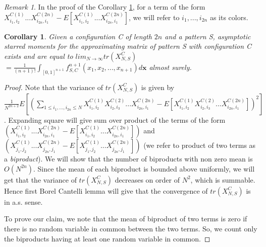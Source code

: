 \documentclass[12pt]{amsart}
\newtheorem{corollary}[thm]{Corollary}
\theoremstyle{definition}
\theoremstyle{remark}
\newtheorem{remark}{Remark}
\begin{document}
\begin{remark}\label{rem5}
In the proof of the Corollary \ref{as}, for a term of the form $X_{i_1,i_2}^{C(1)}...X_{i_{2n},i_{1}}^{C(2n)} - E[X_{i_1,i_2}^{C(1)}...X_{i_{2n},i_{1}}^{C(2n)}]$, we will refer to  $i_1,...,i_{2n}$ as its colors.
\end{remark}


\begin{corollary} \label{as}
Given a configuration C of length $2n$ and a pattern S, asymptotic starred moments for the approximating matrix of pattern S with configuration C exists and are equal to $ lim_{N \to \infty} tr(X_{N,S}^C)$ $= \frac{1}{(n+1)!}\int_{[0,1]^{n+1}}f_{S,C}^{n+1}(x_1,x_2,...,x_{n+1})d\mathbf{x}$ almost surely.
\end{corollary}
\begin{proof}
Note that the variance of $tr(X_{N,S}^C)$ is given by \\ $\frac{1}{N^{2n+2}} E[(\sum_{1 \leq i_1,...,i_{2n} \leq N} X_{i_1,i_2}^{C(1)}X_{i_2,i_3}^{C(2)}...X_{i_{2n},i_{1}}^{C(2n)} - E[X_{i_1,i_2}^{C(1)}X_{i_2,i_3}^{C(2)}...X_{i_{2n},i_{1}}^{C(2n)}])^2]$. Expanding square will give sum over product of the terms of the form $(X_{i_1,i_2}^{C(1)}...X_{i_{2n},i_{1}}^{C(2n)} - E[X_{i_1,i_2}^{C(1)}...X_{i_{2n},i_{1}}^{C(2n)}])$ and $(X_{j_1,j_2}^{C(1)}...X_{j_{2n},j_{1}}^{C(2n)} - E[X_{j_1,j_2}^{C(1)}...X_{j_{2n},j_{1}}^{C(2n)}])$ (we refer to product of two terms as a \textit{biproduct}). We will show that the number of biproducts with non zero mean is $O(N^{2n})$. Since the mean of each biproduct is bounded above uniformly, we will get that the variance of $tr(X_{N,S}^C)$ decreases on order of $N^2$, which is summable. Hence first Borel Cantelli lemma will give that the convergence of  $tr(X_{N,S}^C)$ is in a.s. sense.\par
To prove our claim, we note that the mean of biproduct of two terms is zero if there is no random variable in common between the two terms. So, we count only the biproducts having at least one random variable in common. \par


\end{proof}
\end{document}

